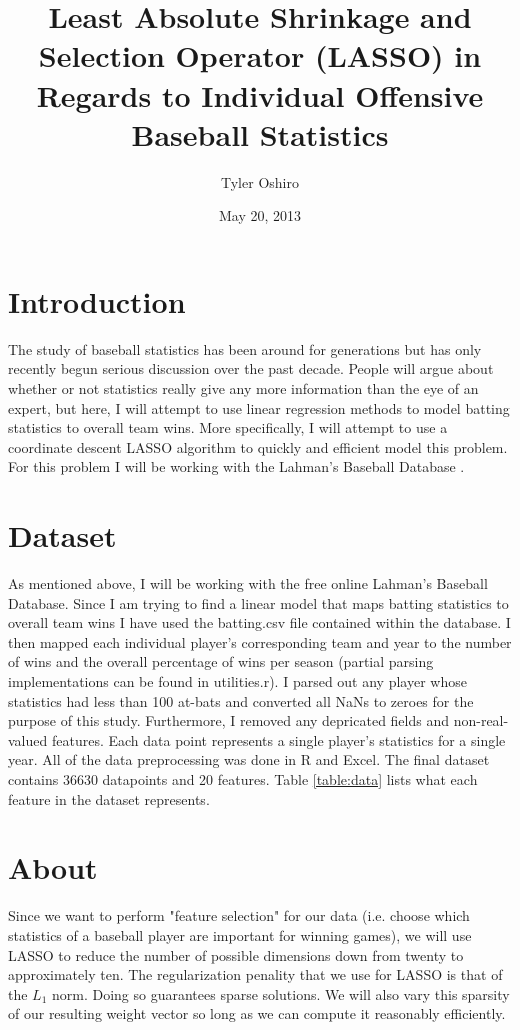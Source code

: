 \documentclass{article}
\title{Least Absolute Shrinkage and Selection Operator (LASSO) in Regards to Individual Offensive Baseball Statistics}
\author{Tyler Oshiro}
\date{May 20, 2013}
\begin{document}
\maketitle
\tableofcontents
\newpage
\section{Introduction}
\label{Introduction}
The study of baseball statistics has been around for generations but has only recently begun serious discussion over the past decade. People will argue about whether or not statistics really give any more information than the eye of an expert, but here, I will attempt to use linear regression methods to model batting statistics to overall team wins. More specifically, I will attempt to use a coordinate descent LASSO algorithm to quickly and efficient model this problem. For this problem I will be working with the Lahman's Baseball Database \cite{lahman}.
\section{Dataset}
\label{Dataset}
As mentioned above, I will be working with the free online Lahman's Baseball Database. Since I am trying to find a linear model that maps batting statistics to overall team wins I have used the batting.csv file contained within the database. I then mapped each individual player's corresponding team and year to the number of wins and the overall percentage of wins per season (partial parsing implementations can be found in utilities.r). I parsed out any player whose statistics had less than 100 at-bats and converted all NaNs to zeroes for the purpose of this study. Furthermore, I removed any depricated fields and non-real-valued features. Each data point represents a single player's statistics for a single year. All of the data preprocessing was done in R and Excel. The final dataset contains 36630 datapoints and 20 features. Table \ref{table:data} lists what each feature in the dataset represents.
\section{About}
\label{About}
Since we want to perform "feature selection" for our data (i.e. choose which statistics of a baseball player are important for winning games), we will use LASSO to reduce the number of possible dimensions down from twenty to approximately ten. The regularization penality that we use for LASSO is that of the ${L_1}$ norm. Doing so guarantees sparse solutions. We will also vary this sparsity of our resulting weight vector so long as we can compute it reasonably efficiently.
\end{document}
